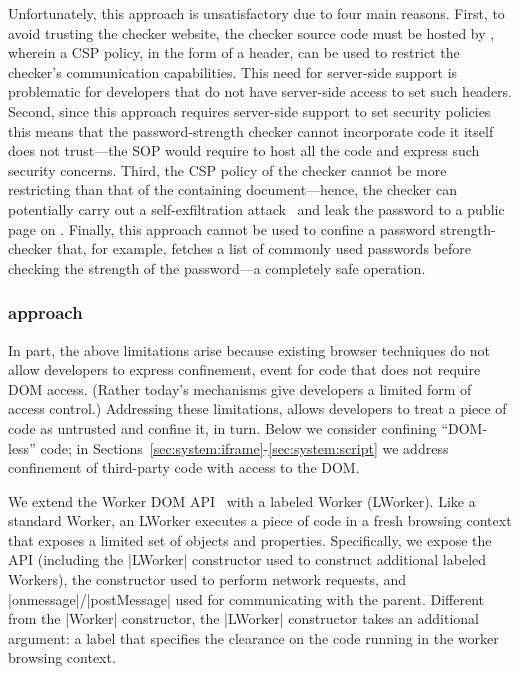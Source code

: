 Unfortunately, this approach is unsatisfactory due to four main reasons.
%
First, to avoid trusting the checker website, the checker source code
must be hosted by , wherein a CSP policy, in the
form of a header, can be used to restrict the checker's communication
capabilities. 
%
This need for server-side support is problematic for developers that
do not have server-side access to set such headers.
%
Second, since this approach requires server-side support to set
security policies this means that the password-strength checker cannot
incorporate code it itself does not trust---the SOP would require
 to host all the code and express such security
concerns.
%
Third, the CSP policy of the checker cannot be more restricting than
that of the containing document---hence, the checker can potentially
carry out a self-exfiltration attack~ and
leak the password to a public page on .
%
Finally, this approach cannot be used to confine a password
strength-checker that, for example, fetches a list of commonly used
passwords before checking the strength of the password---a completely
safe operation.
%

\subsubsection{\sys{} approach}
%
In part, the above limitations arise because existing browser
techniques do not allow developers to express confinement, event for
code that does not require DOM access.
%
(Rather today's mechanisms give developers a limited form of access
control.)
%
Addressing these limitations, \sys{} allows developers to treat a
piece of code as untrusted and confine it, in turn.
%
Below we consider confining ``DOM-less'' code; in
Sections~\ref{sec:system:iframe}-\ref{sec:system:script} we address
confinement of third-party code with access to the DOM.

We extend the Worker DOM API~ with a labeled Worker
(LWorker).
%
Like a standard Worker, an LWorker executes a piece of code in a fresh
browsing context that exposes a limited set of objects and properties.
%
Specifically, we expose the \sys{} API (including the \js|LWorker|
constructor used to construct additional labeled Workers), the \xhr{}
constructor used to perform network requests, and
\js|onmessage|/\js|postMessage| used for communicating with the
parent.
%
Different from the \js|Worker| constructor, the \js|LWorker|
constructor takes an additional argument: a label that specifies the
clearance on the code running in the worker browsing context.

